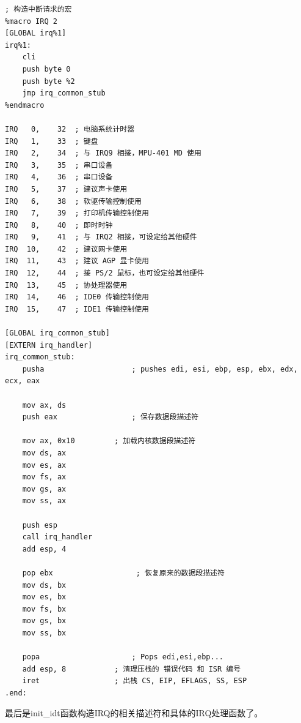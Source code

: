 \begin{lstlisting}[language = {[x86masm]Assembler}, caption = gdt/gdt\_s.s]
; 构造中断请求的宏
%macro IRQ 2
[GLOBAL irq%1]
irq%1:
	cli
	push byte 0
	push byte %2
	jmp irq_common_stub
%endmacro

IRQ   0,    32 	; 电脑系统计时器
IRQ   1,    33 	; 键盘
IRQ   2,    34 	; 与 IRQ9 相接，MPU-401 MD 使用
IRQ   3,    35 	; 串口设备
IRQ   4,    36 	; 串口设备
IRQ   5,    37 	; 建议声卡使用
IRQ   6,    38 	; 软驱传输控制使用
IRQ   7,    39 	; 打印机传输控制使用
IRQ   8,    40 	; 即时时钟
IRQ   9,    41 	; 与 IRQ2 相接，可设定给其他硬件
IRQ  10,    42 	; 建议网卡使用
IRQ  11,    43 	; 建议 AGP 显卡使用
IRQ  12,    44 	; 接 PS/2 鼠标，也可设定给其他硬件
IRQ  13,    45 	; 协处理器使用
IRQ  14,    46 	; IDE0 传输控制使用
IRQ  15,    47 	; IDE1 传输控制使用

[GLOBAL irq_common_stub]
[EXTERN irq_handler]
irq_common_stub:
	pusha                    ; pushes edi, esi, ebp, esp, ebx, edx, ecx, eax
	
	mov ax, ds
	push eax                 ; 保存数据段描述符
	
	mov ax, 0x10  		 ; 加载内核数据段描述符
	mov ds, ax
	mov es, ax
	mov fs, ax
	mov gs, ax
	mov ss, ax
	
	push esp
	call irq_handler
	add esp, 4
	
	pop ebx                   ; 恢复原来的数据段描述符
	mov ds, bx
	mov es, bx
	mov fs, bx
	mov gs, bx
	mov ss, bx
	
	popa                     ; Pops edi,esi,ebp...
	add esp, 8     		 ; 清理压栈的 错误代码 和 ISR 编号
	iret          		 ; 出栈 CS, EIP, EFLAGS, SS, ESP
.end:
\end{lstlisting}

\par 最后是init\_idt函数构造IRQ的相关描述符和具体的IRQ处理函数了。

